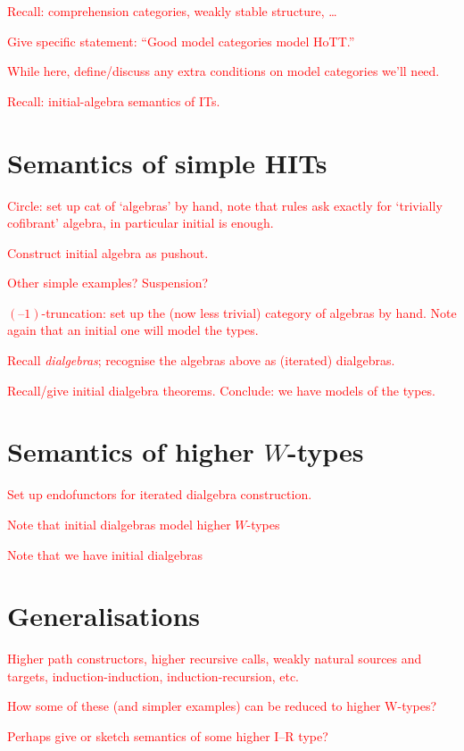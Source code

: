 \documentclass{amsart}
\newcommand{\todo}[1]{\textcolor{red}{#1}}
\begin{document}
\todo{Recall: comprehension categories, weakly stable structure, \ldots}

\todo{Give specific statement: “Good model categories model HoTT.”}

\todo{While here, define/discuss any extra conditions on model categories we’ll need.}

\todo{Recall: initial-algebra semantics of ITs.}

\section{Semantics of simple HITs}

\todo{Circle: set up cat of ‘algebras’ by hand, note that rules ask exactly for ‘trivially cofibrant’ algebra, in particular initial is enough.}

\todo{Construct initial algebra as pushout.}

\todo{Other simple examples?  Suspension?}

\todo{$(–1)$-truncation: set up the (now less trivial) category of algebras by hand. Note again that an initial one will model the types.}

\todo{Recall \emph{dialgebras}; recognise the algebras above as (iterated) dialgebras.}

\todo{Recall/give initial dialgebra theorems.  Conclude: we have models of the types.}

\section{Semantics of higher $W$-types}

\todo{Set up endofunctors for iterated dialgebra construction.}

\todo{Note that initial dialgebras model higher $W$-types}

\todo{Note that we have initial dialgebras}

\section{Generalisations}

\todo{Higher path constructors, higher recursive calls, weakly natural sources and targets, induction-induction, induction-recursion, etc.}

\todo{How some of these (and simpler examples) can be reduced to higher W-types?}

\todo{Perhaps give or sketch semantics of some higher I–R type?}
\end{document}
